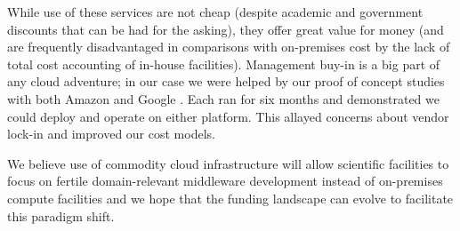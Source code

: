 \documentclass[11pt,twoside]{article}
\begin{document}
While use of these services are not cheap (despite academic and government discounts that can be had for the asking), they offer great value for money (and are frequently disadvantaged in comparisons with on-premises cost by the lack of total cost accounting of in-house facilities).
Management buy-in is a big part of any cloud adventure; in our case we were helped by our proof of concept studies with both Amazon \citep{2020arXiv201106044B,DMTN-137} and Google \citep{DMTN-125}. Each ran for six months and demonstrated we could deploy and operate on either platform. This allayed concerns about vendor lock-in and improved our cost models.

We believe use of commodity cloud infrastructure will allow scientific facilities to focus on fertile domain-relevant middleware development instead of on-premises compute facilities and we hope that the funding landscape can evolve to facilitate this paradigm shift.
\end{document}
